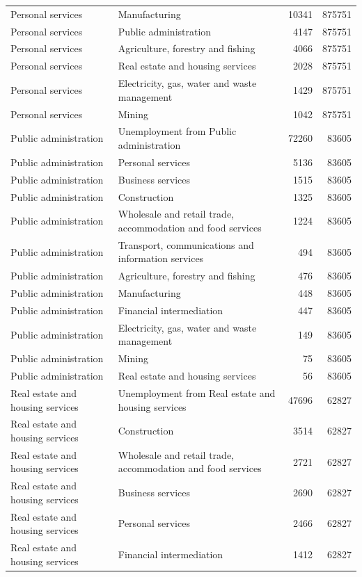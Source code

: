 \begin{longtable}{llrr}
Personal services & Manufacturing & 10341 & 875751 \\
Personal services & Public administration & 4147 & 875751 \\
Personal services & Agriculture, forestry and fishing & 4066 & 875751 \\
Personal services & Real estate and housing services & 2028 & 875751 \\
Personal services & Electricity, gas, water and waste management & 1429 & 875751 \\
Personal services & Mining & 1042 & 875751 \\
Public administration & Unemployment from Public administration & 72260 & 83605 \\
Public administration & Personal services & 5136 & 83605 \\
Public administration & Business services & 1515 & 83605 \\
Public administration & Construction & 1325 & 83605 \\
Public administration & Wholesale and retail trade, accommodation and food services & 1224 & 83605 \\
Public administration & Transport, communications and information services & 494 & 83605 \\
Public administration & Agriculture, forestry and fishing & 476 & 83605 \\
Public administration & Manufacturing & 448 & 83605 \\
Public administration & Financial intermediation & 447 & 83605 \\
Public administration & Electricity, gas, water and waste management & 149 & 83605 \\
Public administration & Mining & 75 & 83605 \\
Public administration & Real estate and housing services & 56 & 83605 \\
Real estate and housing services & Unemployment from Real estate and housing services & 47696 & 62827 \\
Real estate and housing services & Construction & 3514 & 62827 \\
Real estate and housing services & Wholesale and retail trade, accommodation and food services & 2721 & 62827 \\
Real estate and housing services & Business services & 2690 & 62827 \\
Real estate and housing services & Personal services & 2466 & 62827 \\
Real estate and housing services & Financial intermediation & 1412 & 62827 \\

\end{longtable}
